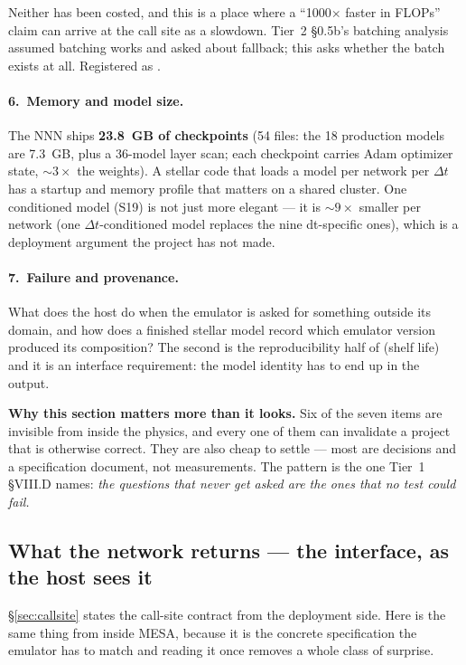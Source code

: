 Neither has been costed, and this is a place where a ``1000$\times$ faster in
FLOPs'' claim can arrive at the call site as a slowdown. Tier~2 \S 0.5b's
batching analysis assumed batching works and asked about fallback; this asks
whether the batch exists at all. Registered as .

\paragraph{6.\ Memory and model size.} The NNN ships \textbf{23.8~GB of
checkpoints} (54 files: the 18 production models are 7.3~GB, plus a 36-model
layer scan; each checkpoint carries Adam optimizer state, ${\sim}3\times$ the
weights). A stellar code that loads a model per network per $\Delta t$ has a
startup and memory profile that matters on a shared cluster. One conditioned
model (S19) is not just more elegant --- it is ${\sim}9\times$ smaller per
network (one $\Delta t$-conditioned model replaces the nine dt-specific ones),
which is a deployment argument the project has not made.

\paragraph{7.\ Failure and provenance.} What does the host do when the emulator
is asked for something outside its domain, and how does a finished stellar model
record which emulator version produced its composition? The second is the
reproducibility half of  (shelf life) and it is an
interface requirement: the model identity has to end up in the output.

\textbf{Why this section matters more than it looks.} Six of the seven items
are invisible from inside the physics, and every one of them can invalidate a
project that is otherwise correct. They are also cheap to settle --- most are
decisions and a specification document, not measurements. The pattern is the
one Tier~1 \S VIII.D names: \emph{the questions that never get asked are the
ones that no test could fail.}

\subsection{What the network returns --- the interface, as the host sees it}
\label{sec:netreturns}

\S\ref{sec:callsite} states the call-site contract from the deployment side.
Here is the same thing from inside MESA, because it is the concrete
specification the emulator has to match and reading it once removes a whole
class of surprise.


